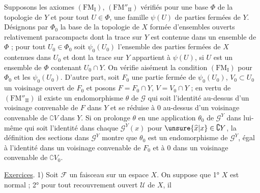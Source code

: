 Supposons les axiomes $(\mathrm{FM}_{\mathrm I})$, $(\mathrm{FM}''_{\mathrm{II}})$ vérifiés pour une base $\Phi$ de la topologie de $Y$ et pour tout $U\in\Phi$, une famille $\psi(U)$ de parties fermées de $Y$. Désignons par $\Phi_0$ la base de la topologie de $X$ formée d'ensembles ouverts relativement paracompacts dont la trace sur $Y$ est contenue dans un ensemble de $\Phi$ ; pour tout $U_0\in\Phi_0$ soit $\psi_0(U_0)$ l'ensemble des parties fermées de $X$ contenues dans $U_0$ et dont la trace sur $Y$ appartient à $\psi(U)$, si $U$ est un ensemble de $\Phi$ contenant $U_0\cap Y$. On vérifie aisément la condition $(\mathrm{FM}_{\mathrm I})$ pour $\Phi_0$ et les $\psi_0(U_0)$. D'autre part, soit $F_0$ une partie fermée de $\psi_0(U_0)$, $V_0\subset U_0$ un voisinage ouvert de $F_0$ et posons $F=F_0\cap Y$, $V=V_0\cap Y$ ; en vertu de $(\mathrm{FM}''_{\mathrm{II}})$ il existe un endomorphisme $\theta$ de $\mathcal G$ qui soit l'identité au-dessus d'un voisinage convenable de $F$ dans $Y$ et se réduise à $0$ au-dessus d'un voisinage convenable de $\complement V$ dans $Y$. Si on prolonge $\theta$ en une application $\theta_0$ de $\mathcal G^Y$ dans lui-même qui soit l'identité dans chaque $\mathcal G^Y(x)$ pour $\unsure{\widehat x|x}\in\complement Y$, la définition des sections dans $\mathcal G^Y$ montre que $\theta_0$ est un endomorphisme de $\mathcal G^Y$, égal à l'identité dans un voisinage convenable de $F_0$ et à $0$ dans un voisinage convenable de $\complement V_0$.

\uline{Exercices}. 1) Soit $\mathcal F$ un faisceau sur un espace $X$. On suppose que 1° $X$ est normal ; 2° pour tout recouvrement ouvert $\mathcal U$ de $X$, il

